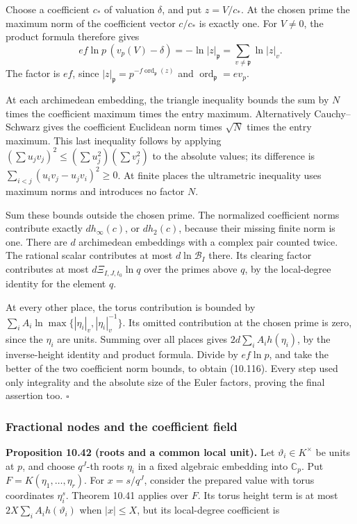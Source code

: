 \documentclass[
  11pt,
  a4paper,
]{article}
\begin{document}
Choose a coefficient \(c_*\) of valuation \(\delta\), and put
\(z=V/c_*\). At the chosen prime the maximum norm of the coefficient
vector \(c/c_*\) is exactly one. For \(V\ne0\), the product formula
therefore gives \[
ef\ln p\,(v_p(V)-\delta)
=-\ln|z|_{\mathfrak p}
=\sum_{v\ne\mathfrak p}\ln|z|_v.
\] The factor is \(ef\), since
\(|z|_{\mathfrak p}=p^{-f\operatorname{ord}_{\mathfrak p}(z)}\) and
\(\operatorname{ord}_{\mathfrak p}=ev_p\).

At each archimedean embedding, the triangle inequality bounds the sum by
\(N\) times the coefficient maximum times the entry maximum.
Alternatively Cauchy--Schwarz gives the coefficient Euclidean norm times
\(\sqrt N\) times the entry maximum. This last inequality follows by
applying \((\sum u_jv_j)^2\le(\sum u_j^2)(\sum v_j^2)\) to the absolute
values; its difference is \(\sum_{i<j}(u_iv_j-u_jv_i)^2\ge0\). At finite
places the ultrametric inequality uses maximum norms and introduces no
factor \(N\).

Sum these bounds outside the chosen prime. The normalized coefficient
norms contribute exactly \(d h_\infty(c)\), or \(d h_2(c)\), because
their missing finite norm is one. There are \(d\) archimedean embeddings
with a complex pair counted twice. The rational scalar contributes at
most \(d\ln\mathcal B_I\) there. Its clearing factor contributes at most
\(d\Xi_{I,J,t_0}\ln q\) over the primes above \(q\), by the local-degree
identity for the element \(q\).

At every other place, the torus contribution is bounded by
\(\sum_iA_i\ln\max\{|\eta_i|_v,|\eta_i|_v^{-1}\}\). Its omitted
contribution at the chosen prime is zero, since the \(\eta_i\) are
units. Summing over all places gives \(2d\sum_iA_i h(\eta_i)\), by the
inverse-height identity and product formula. Divide by \(ef\ln p\), and
take the better of the two coefficient norm bounds, to obtain (10.116).
Every step used only integrality and the absolute size of the Euler
factors, proving the final assertion too. \(\square\)

\subsubsection{Fractional nodes and the coefficient
field}\label{fractional-nodes-and-the-coefficient-field}

\textbf{Proposition 10.42 (roots and a common local unit).} Let
\(\vartheta_i\in K^\times\) be units at \(p\), and choose \(q^J\)-th
roots \(\eta_i\) in a fixed algebraic embedding into \(\mathbb C_p\).
Put \(F=K(\eta_1,\ldots,\eta_r)\). For \(x=s/q^J\), consider the
prepared value with torus coordinates \(\eta_i^s\). Theorem 10.41
applies over \(F\). Its torus height term is at most
\(2X\sum_iA_i h(\vartheta_i)\) when \(|x|\le X\), but its local-degree
coefficient is
\end{document}
